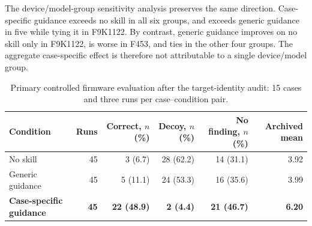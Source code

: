 \documentclass[11pt]{article}
\newcommand{\compacttable}{\footnotesize\setlength{\tabcolsep}{3.5pt}\renewcommand{\arraystretch}{1.08}}
\newcommand{\thead}[1]{\textbf{#1}}
\begin{document}
The device/model-group sensitivity analysis preserves the same direction.  Case-specific
guidance exceeds no skill in all six groups, and exceeds generic guidance in five while
tying it in F9K1122.  By contrast, generic guidance improves on no skill only in
F9K1122, is worse in F453, and ties in the other four groups.  The aggregate case-specific
effect is therefore not attributable to a single device/model group.

\begin{table}[t]
\centering
\caption{Primary controlled firmware evaluation after the target-identity audit: 15
cases and three runs per case--condition pair.}
\label{tab:frozen_results}
\compacttable
\setlength{\tabcolsep}{3.5pt}
\begin{tabular}{lrrrrr}
\toprule
\thead{Condition} & \thead{Runs} & \thead{Correct, $n$ (\%)} & \thead{Decoy, $n$ (\%)} & \thead{No finding, $n$ (\%)} & \thead{Archived mean} \\
\midrule
No skill & 45 & 3 (6.7) & 28 (62.2) & 14 (31.1) & 3.92 \\
Generic guidance & 45 & 5 (11.1) & 24 (53.3) & 16 (35.6) & 3.99 \\
\textbf{Case-specific guidance} & \textbf{45} & \textbf{22 (48.9)} & \textbf{2 (4.4)} & \textbf{21 (46.7)} & \textbf{6.20} \\
\bottomrule
\end{tabular}
\end{table}
\end{document}
